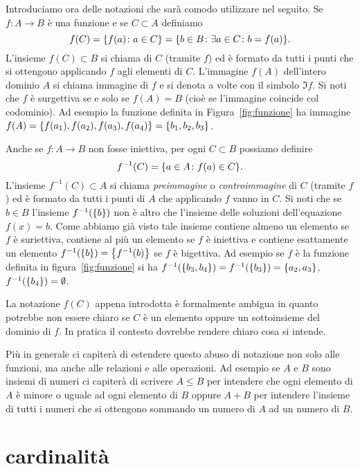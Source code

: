 Introduciamo ora delle notazioni che sarà comodo utilizzare nel seguito.
Se $f\colon A \to B$ è una funzione e se $C\subset A$ definiamo
\[
  f(C) = {\left\{ f(a)\colon a \in C \right\}} = {\left\{ b\in B\colon \exists a\in C\colon b=f(a) \right\}}.
\]
L'insieme $f(C)\subset B$ si chiama 
%
di $C$ (tramite $f$) ed è formato
da tutti i punti che si ottengono applicando $f$ agli elementi di $C$.
L'immagine $f(A)$ dell'intero dominio $A$ si chiama immagine di $f$
e si denota a volte con il simbolo $\Im f$.
Si noti che $f$ è surgettiva se e solo se $f(A)=B$ (cioè se l'immagine coincide
col codominio).
Ad esempio la funzione definita in Figura~\ref{fig:funzione}
ha immagine $f(A) = {\left\{ f(a_1),f(a_2),f(a_3),f(a_4) \right\}} 
 = {\left\{ b_1, b_2, b_3 \right\}}$.

Anche se $f\colon A \to B$ non fosse iniettiva,
per ogni $C\subset B$ possiamo definire
\[
  f^{-1}(C) = {\left\{ a\in A\colon f(a) \in C \right\}}.
\]
L'insieme $f^{-1}(C)\subset A$ si chiama \emph{preimmagine}
o \emph{controimmagine}
%
%
%
%
di $C$ (tramite $f$)
ed è formato da tutti i punti di $A$ che applicando $f$ vanno in $C$.
Si noti che se $b\in B$ l'insieme $f^{-1}({\left\{ b \right\}})$ non è altro che
l'insieme delle soluzioni dell'equazione $f(x)=b$. Come abbiamo
già visto tale insieme contiene almeno un elemento se $f$ è suriettiva,
contiene al più un elemento se $f$ è iniettiva e contiene esattamente
un elemento $f^{-1}({\left\{ b \right\}}) = {\left\{ f^{-1}(b) \right\}}$ se $f$ è bigettiva.
Ad esempio se $f$ è la funzione definita in figura~\ref{fig:funzione}
si ha $f^{-1}({\left\{ b_3,b_4 \right\}}) = f^{-1}({\left\{ b_3 \right\}}) = {\left\{ a_2,a_3 \right\}}$,
$f^{-1}({\left\{ b_4 \right\}}) = \emptyset$.


La notazione $f(C)$ appena introdotta è formalmente ambigua in quanto
potrebbe non essere chiaro se $C$ è un elemento oppure un sottoinsieme
del dominio di $f$.
In pratica il contesto dovrebbe rendere chiaro cosa si intende.

Più in generale ci capiterà di estendere questo abuso di notazione non solo
alle funzioni, ma anche alle relazioni e alle operazioni.
Ad esempio se $A$ e $B$ sono insiemi di numeri ci capiterà di scrivere $A\le B$
per intendere che ogni elemento di $A$ è minore o uguale ad ogni elemento di $B$
oppure $A+B$ per intendere l'insieme di tutti i numeri che si ottengono sommando
un numero di $A$ ad un numero di $B$.

\section{cardinalità}

